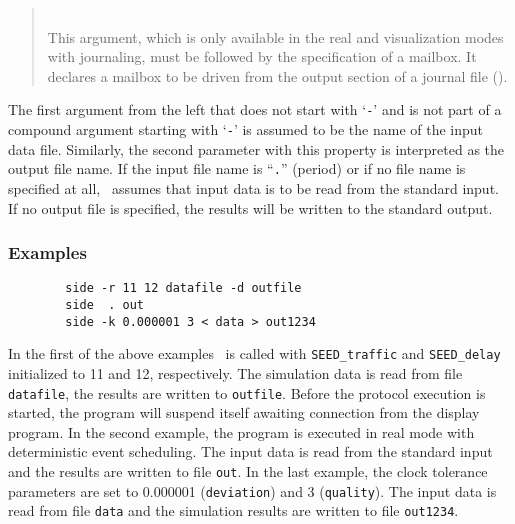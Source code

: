 \begin{quote}
\noindent{}\\ \hspace{0in}
This argument, which is only available in the real and visualization
modes with journaling, must be followed
by the specification of a mailbox.
It declares a mailbox to be driven from the output section of a journal
file ().
\end{quote}
\medskip

The first argument from the left that does not start with `{\tt -}' and is not
part of a compound argument starting with `{\tt -}'
is assumed to be the name of the input data file.
Similarly, the
second parameter with this property is interpreted as the output file name.
If the input file name is ``{\tt .}'' (period) or if no file name is
specified at all, \smurph\ assumes that input data is to be read from the
standard input.
If no output file is specified, the results will be written to the
standard output.

\subsubsection*{Examples}

\noindent
\begin{verbatim}
        side -r 11 12 datafile -d outfile
        side  . out
        side -k 0.000001 3 < data > out1234
\end{verbatim}

In the first of the above examples \smurphtts\ is called
with {\tt SEED\_traffic}
and {\tt SEED\_delay} initialized to 11 and 12, respectively.
The simulation
data is read from file {\tt datafile}, the results are written to {\tt outfile}.
Before the protocol execution is started, the program will suspend itself
awaiting connection from the display program.
In the second example, the program is executed in real mode with
deterministic event scheduling.
The input data is read from the standard
input and the results are written to file {\tt out}.
In the last example, the clock tolerance parameters are set to
0.000001 ({\tt deviation}) and 3 ({\tt quality}).
The input data is read from file {\tt data} and the simulation results
are written to file {\tt out1234}.

